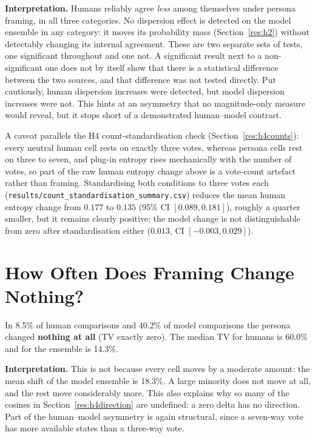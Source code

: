 \noindent
\textbf{Interpretation.} Humans reliably agree \emph{less} among themselves under persona
framing, in all three categories. No dispersion effect is detected on the model ensemble in any
category: it moves its probability mass (Section~\ref{res:h2}) without detectably changing its
internal agreement. These are two separate sets of tests, one significant throughout and one
not. A significant result next to a non-significant one does not by itself show that there is a
statistical difference between the two sources, and that difference was not tested directly. Put
cautiously, human dispersion increases were detected, but model dispersion increases were not.
This hints at an asymmetry that no magnitude-only measure would reveal, but it stops short of a
demonstrated human--model contrast.

A caveat parallels the H4 count-standardisation check (Section~\ref{res:h4counts}): every neutral
human cell rests on exactly three votes, whereas persona cells rest on three to seven, and
plug-in entropy rises mechanically with the number of votes, so part of the raw human entropy
change above is a vote-count artefact rather than framing. Standardising both conditions to three
votes each (\texttt{results/\allowbreak count\_\allowbreak standardisation\_\allowbreak summary.csv}) reduces the mean human entropy
change from $0.177$ to $0.135$ (95\% CI $[0.089, 0.181]$), roughly a quarter smaller, but it
remains clearly positive; the model change is not distinguishable from zero after standardisation
either ($0.013$, CI $[-0.003, 0.029]$).

\section{How Often Does Framing Change Nothing?}
\label{res:zeroshift}

\noindent
In 8.5\% of human comparisons and 40.2\% of model comparisons the persona changed \textbf{nothing
at all} (TV exactly zero). The median TV for humans is 60.0\% and for the ensemble is 14.3\%.

\textbf{Interpretation.} This is not because every cell moves by a moderate amount: the mean
shift of the model ensemble is 18.3\%. A large minority does not move at all, and the rest move
considerably more. This also explains why so many of the cosines in Section~\ref{res:h4direction} are
undefined: a zero delta has no direction. Part of the human--model asymmetry is again structural,
since a seven-way vote has more available states than a three-way vote.


